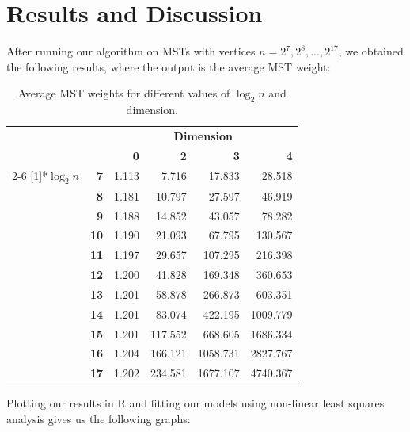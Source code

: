 \documentclass[a4paper]{article}
\begin{document}
\section{Results and Discussion}
After running our algorithm on MSTs with vertices $n=2^7, 2^8, ..., 2^{17}$, we obtained the following results, where the output is the average MST weight:

\begin{table}[htbp]
  \centering
    \begin{tabular}{cr|rrrr}
          & \multicolumn{1}{r}{} & \multicolumn{4}{c}{\textbf{Dimension}} \\
          &       & \textbf{0} & \textbf{2} & \textbf{3} & \textbf{4} \\
\cmidrule{2-6}    \multirow{11}[1]{*}{\textbf{$\log_2n$}} & \textbf{7} & 1.113 & 7.716 & 17.833 & 28.518 \\
          & \textbf{8} & 1.181 & 10.797 & 27.597 & 46.919 \\
          & \textbf{9} & 1.188 & 14.852 & 43.057 & 78.282 \\
          & \textbf{10} & 1.190 & 21.093 & 67.795 & 130.567 \\
          & \textbf{11} & 1.197 & 29.657 & 107.295 & 216.398 \\
          & \textbf{12} & 1.200 & 41.828 & 169.348 & 360.653 \\
          & \textbf{13} & 1.201 & 58.878 & 266.873 & 603.351 \\
          & \textbf{14} & 1.201 & 83.074 & 422.195 & 1009.779 \\
          & \textbf{15} & 1.201 & 117.552 & 668.605 & 1686.334 \\
          & \textbf{16} & 1.204 & 166.121 & 1058.731 & 2827.767 \\
          & \textbf{17} & 1.202 & 234.581 & 1677.107 & 4740.367 \\
    \end{tabular}%
  \caption{Average MST weights for different values of $\log_2n$ and dimension.}
  \label{tab:addlabel}%
\end{table}%

Plotting our results in R and fitting our models using non-linear least squares analysis gives us the following graphs:
\end{document}
